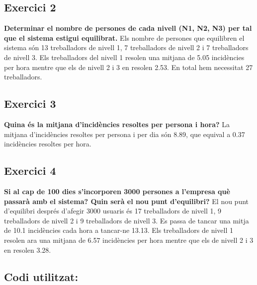 \documentclass[8pt]{beamer}
\begin{document}
\begin{frame}
\subsection{Exercici 2}
\textbf{Determinar el nombre de persones de cada nivell (N1, N2, N3) per tal que el sistema
estigui equilibrat.}
\newline
\newline
Els nombre de persones que equilibren el sistema són 13 treballadors de nivell 1, 7 treballadors de nivell 2 i 7 treballadors de nivell 3.
\newline Els treballadors del nivell 1 resolen una mitjana de 5.05 incidències per hora mentre que els de nivell 2 i 3 en resolen 2.53.
En total hem necessitat 27 treballadors.
\end{frame}
\begin{frame}
\subsection{Exercici 3}
\textbf{Quina és la mitjana d’incidències resoltes per persona i hora?}
\newline
\newline
La mitjana d'incidències resoltes per persona i per dia són 8.89, que equival a 0.37 incidències resoltes per hora.
\end{frame}
\begin{frame}
\subsection{Exercici 4}
\textbf{Si al cap de 100 dies s’incorporen 3000 persones a l’empresa què passarà amb el sistema?
Quin serà el nou punt d’equilibri?}
\newline
\newline
El nou punt d'equilibri després d'afegir 3000 usuaris és 17 treballadors de nivell 1, 9 treballadors de nivell 2 i 9 treballadors de nivell 3.
\newline Es passa de tancar una mitja de 10.1 incidències cada hora a tancar-ne 13.13.  
\newline Els treballadors de nivell 1 resolen ara una mitjana de 6.57 incidències per hora mentre que els de nivell 2 i 3 en resolen 3.28.
\subsection{Codi utilitzat:}

\end{frame}
\end{document}
